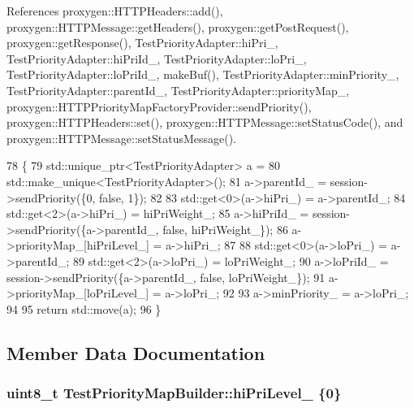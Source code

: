 References proxygen\+::\+H\+T\+T\+P\+Headers\+::add(), proxygen\+::\+H\+T\+T\+P\+Message\+::get\+Headers(), proxygen\+::get\+Post\+Request(), proxygen\+::get\+Response(), Test\+Priority\+Adapter\+::hi\+Pri\+\_\+, Test\+Priority\+Adapter\+::hi\+Pri\+Id\+\_\+, Test\+Priority\+Adapter\+::lo\+Pri\+\_\+, Test\+Priority\+Adapter\+::lo\+Pri\+Id\+\_\+, make\+Buf(), Test\+Priority\+Adapter\+::min\+Priority\+\_\+, Test\+Priority\+Adapter\+::parent\+Id\+\_\+, Test\+Priority\+Adapter\+::priority\+Map\+\_\+, proxygen\+::\+H\+T\+T\+P\+Priority\+Map\+Factory\+Provider\+::send\+Priority(), proxygen\+::\+H\+T\+T\+P\+Headers\+::set(), proxygen\+::\+H\+T\+T\+P\+Message\+::set\+Status\+Code(), and proxygen\+::\+H\+T\+T\+P\+Message\+::set\+Status\+Message().


\begin{DoxyCode}
78                                                        \{
79   std::unique\_ptr<TestPriorityAdapter>  a =
80       std::make\_unique<TestPriorityAdapter>();
81   a->parentId_ = session->sendPriority(\{0, \textcolor{keyword}{false}, 1\});
82 
83   std::get<0>(a->hiPri_) = a->parentId_;
84   std::get<2>(a->hiPri_) = hiPriWeight_;
85   a->hiPriId_ = session->sendPriority(\{a->parentId_, \textcolor{keyword}{false}, hiPriWeight_\});
86   a->priorityMap_[hiPriLevel_] = a->hiPri_;
87 
88   std::get<0>(a->loPri_) = a->parentId_;
89   std::get<2>(a->loPri_) = loPriWeight_;
90   a->loPriId_ = session->sendPriority(\{a->parentId_, \textcolor{keyword}{false}, loPriWeight_\});
91   a->priorityMap_[loPriLevel_] = a->loPri_;
92 
93   a->minPriority_ = a->loPri_;
94 
95   \textcolor{keywordflow}{return} std::move(a);
96 \}
\end{DoxyCode}


\subsection{Member Data Documentation}
\subsubsection[{hi\+Pri\+Level\+\_\+}]{\setlength{\rightskip}{0pt plus 5cm}uint8\+\_\+t Test\+Priority\+Map\+Builder\+::hi\+Pri\+Level\+\_\+ \{0\}}\label{classTestPriorityMapBuilder_a6660984818676e2a02636888084c6e2c}


